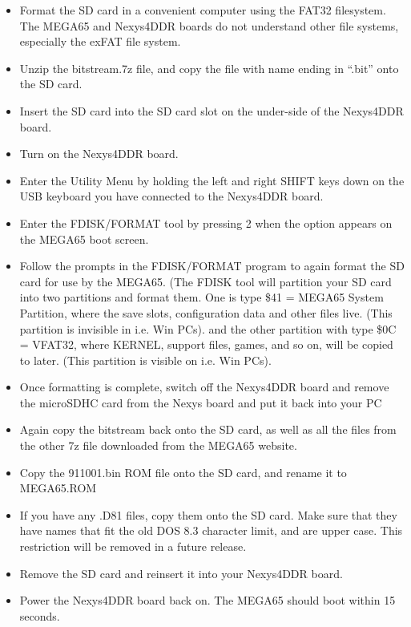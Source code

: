 \begin{itemize}
  \item{Format the SD card}  in a convenient computer using the FAT32 filesystem.  The MEGA65 and Nexys4DDR boards do not understand other
file systems, especially the exFAT file system.
\item{Unzip} the bitstream.7z file, and copy the file with name ending in ``.bit'' onto the SD card.
\item{Insert} the SD card into the SD card slot on the under-side of the Nexys4DDR board.
\item{Turn on} the Nexys4DDR board.
\item{Enter the Utility Menu} by holding the left and right SHIFT keys down on the USB keyboard you have connected to the Nexys4DDR board.
\item{Enter the FDISK/FORMAT tool} by pressing 2 when the option appears on the MEGA65 boot screen.
\item{Follow the prompts} in the FDISK/FORMAT program to again format the SD card for use by the MEGA65.
  (The FDISK tool will partition your SD card into two partitions and format them.
  One is type \$41 = MEGA65 System Partition, where the save slots, configuration data and other files live.
  (This partition is invisible in i.e. Win PCs).
  and the other partition with type \$0C = VFAT32, where KERNEL, support files, games, and so on, will be copied to later.
  (This partition is visible on i.e. Win PCs).
\item{Once formatting is complete}, switch off the Nexys4DDR board and remove the microSDHC card from the Nexys board and put it back into your PC
\item{Again copy} the bitstream back onto the SD card, as well as all the files from the other 7z file downloaded from the MEGA65 website.
\item{Copy the 911001.bin} ROM file onto the SD card, and rename it to MEGA65.ROM
\item{If you have any .D81 files}, copy them onto the SD card. Make sure that they have names that fit the old DOS 8.3 character limit, and are upper case.  This restriction will be removed in a future release.
\item{Remove the SD card} and reinsert it into your Nexys4DDR board.
\item{Power the Nexys4DDR} board back on.  The MEGA65 should boot within 15 seconds.
\end{itemize}





